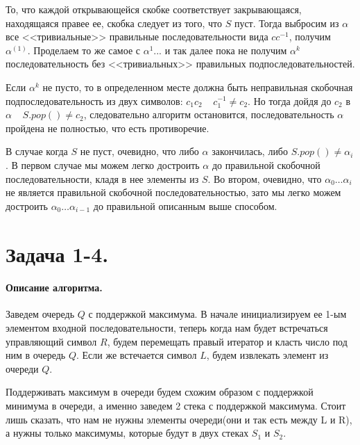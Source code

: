 \documentclass[12pt]{article}
\begin{document}
То, что каждой открывающейся скобке соответствует закрывающаяся, находящаяся правее ее, скобка следует
из того, что $ S $ пуст. Тогда выбросим из $ \alpha $ все <<тривиальные>> правильные последовательности вида
$cc^{-1}$, получим $ \alpha^{(1)} $. 
Проделаем то же самое с $ \alpha^{1} $... и так далее пока не получим
$ \alpha^{k} $ последовательность без <<тривиальных>> правильных подпоследовательностей. 

Если $ \alpha^{k} $ не пусто, то в определенном месте должна быть неправильная скобочная подпоследовательность из двух символов:
$ c_1c_2 \;\;\;\; c_1^{-1} \ne c_2 $. Но тогда дойдя до $ c_2 $ в $ \alpha \;\;\;\; S.pop() \ne c_2 $, следовательно
алгоритм остановится, последовательность $ \alpha $ пройдена не полностью, что есть противоречие.

В случае когда $ S $ не пуст, очевидно, что либо $ \alpha $ закончилась, либо $ S.pop() \ne \alpha_i $. В первом случае
мы можем легко достроить $ \alpha $ до правильной скобочной последовательности, кладя в нее элементы из $ S $. Во втором,
очевидно, что $ \alpha_0\dots \alpha_i $ не является правильной скобочной последовательностью, зато мы легко можем
достроить $ \alpha_0\dots \alpha_{i-1} $ до правильной описанным выше способом. 




\section{Задача 1-4.} 
\paragraph{Описание алгоритма.}
Заведем очередь $ Q $ с поддержкой максимума. В начале инициализируем ее 1-ым элементом входной последовательности, 
теперь когда нам будет встречаться управляющий символ $ R $, будем перемещать правый
итератор и класть число под ним в очередь $ Q $. Если же встечается символ $ L $, будем извлекать 
элемент из очереди $ Q $.

Поддерживать максимум в очереди будем схожим образом с поддержкой минимума в очереди, а именно заведем 2 стека с 
поддержкой максимума. Стоит лишь сказать, что нам не нужны элементы очереди(они и так есть между L и R), 
а нужны только максимумы, которые будут в двух стеках $ S_1 $ и $ S_2 $. 
\end{document}

